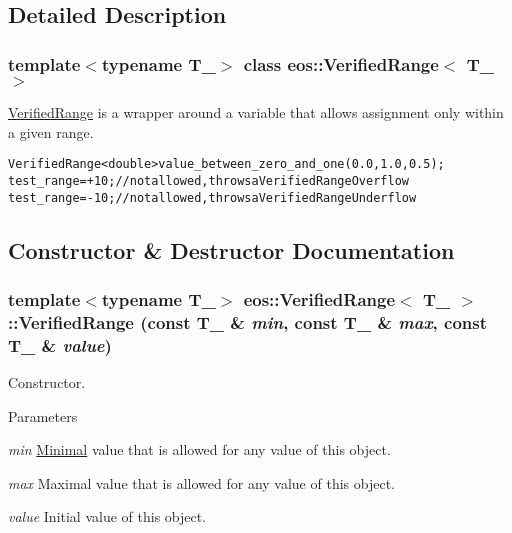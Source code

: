 \subsection{Detailed Description}
\subsubsection*{template$<$typename T\_\-$>$ class eos::VerifiedRange$<$ T\_\- $>$}

\hyperlink{classeos_1_1VerifiedRange}{VerifiedRange} is a wrapper around a variable that allows assignment only within a given range.



\begin{footnotesize}\begin{alltt}
 VerifiedRange<double> value\_between\_zero\_and\_one(0.0, 1.0, 0.5);
 test\_range = +10; \textcolor{comment}{// not allowed, throws a VerifiedRangeOverflow}
 test\_range = -10; \textcolor{comment}{// not allowed, throws a VerifiedRangeUnderflow}
\end{alltt}\end{footnotesize}
 

\subsection{Constructor \& Destructor Documentation}
\hypertarget{classeos_1_1VerifiedRange_a91cf1ba06903af03ec4100c370330cb7}{
\subsubsection[{VerifiedRange}]{\setlength{\rightskip}{0pt plus 5cm}template$<$typename T\_\-$>$ {\bf eos::VerifiedRange}$<$ T\_\- $>$::{\bf VerifiedRange} (const T\_\- \& {\em min}, \/  const T\_\- \& {\em max}, \/  const T\_\- \& {\em value})}}
\label{classeos_1_1VerifiedRange_a91cf1ba06903af03ec4100c370330cb7}
Constructor.


\begin{DoxyParams}{Parameters}
\item[{\em min}]\hyperlink{structeos_1_1Minimal}{Minimal} value that is allowed for any value of this object. \item[{\em max}]Maximal value that is allowed for any value of this object. \item[{\em value}]Initial value of this object. \end{DoxyParams}


